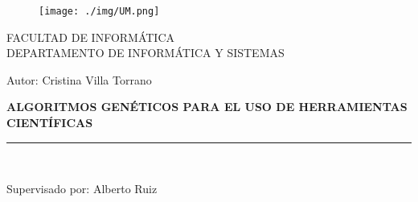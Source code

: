 \documentclass[a4,11pt]{article}
\begin{document}
\begin{titlepage}

\begin{center}
\vspace*{-1in}
\begin{figure}[htb]
\begin{center}
\texttt{[image: ./img/UM.png]}
\end{center}
\end{figure}

FACULTAD DE INFORMÁTICA \\
\vspace*{0.15in}
DEPARTAMENTO DE INFORMÁTICA Y SISTEMAS \\
\vspace*{0.6in}
\begin{large}
Autor: Cristina Villa Torrano \\
\end{large}
\vspace*{0.2in}
\begin{Large}
\textbf{ALGORITMOS GENÉTICOS PARA EL USO DE HERRAMIENTAS CIENTÍFICAS} \\
\end{Large}
\vspace*{0.3in}
\vspace*{0.3in}
\rule{80mm}{0.1mm}\\
\vspace*{0.1in}
\begin{large}
Supervisado por: 
Alberto Ruiz
\end{large}
\end{center}

\end{titlepage}







\begin{abstract}

Gracias al avance de la tecnología, el análisis de datos y el cálculo matemático se ha hecho mucho más sencillo en los últimos años. En el presente documento se tratará un caso de estudio donde se analizará el resultado gracias a las características que ofrece python y sus librerías científicas.

\end{abstract}
\end{document}
